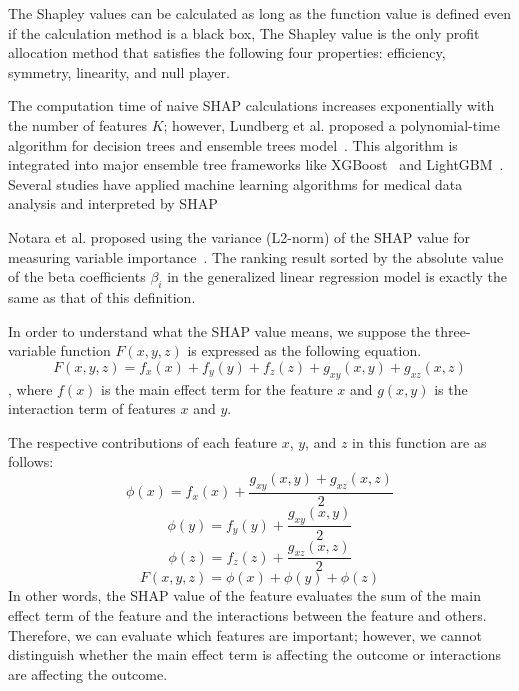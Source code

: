 \documentclass[nohyperref]{article}
\theoremstyle{plain}
\theoremstyle{definition}
\theoremstyle{remark}
\begin{document}
The Shapley values can be calculated as long as the function value is defined even if the calculation method is a black box, 
The Shapley value is the only profit allocation method that satisfies the following four properties: efficiency, symmetry, linearity, and null player.

The computation time of naive SHAP calculations increases exponentially with the number of features $K$; however, Lundberg et al. proposed a polynomial-time algorithm for decision trees and ensemble trees model~\cite{lundberg2020local}.
This algorithm is integrated into major ensemble tree frameworks like XGBoost~\cite{chen2016xgboost} and LightGBM~\cite{ke2017lightgbm}.
Several studies have applied machine learning algorithms for medical data analysis and interpreted by SHAP~\cite{lundberg2020local,moncada2021explainable,inoguchi2021association}

Notara et al. proposed using the variance (L2-norm) of the SHAP value for measuring variable importance~\cite{nohara2022shap}.
The ranking result sorted by the absolute value of the beta coefficients $\beta_i$ in the generalized linear regression model is exactly the same as that of this definition.

In order to understand what the SHAP value means, we suppose the three-variable function $F(x,y,z)$ is expressed as the following equation.
\begin{equation}
F(x,y,z)=f_x(x)+f_y(y)+f_z(z)+g_{xy}(x,y)+g_{xz}(x,z)
\label{3value}
\end{equation}
, where $f(x)$ is the main effect term for the feature $x$ and $g(x,y)$ is the interaction term of features $x$ and $y$.

The respective contributions of each feature $x$, $y$, and $z$ in this function are as follows:
$$\phi(x)=f_x(x)+\frac{g_{xy}(x,y)+g_{xz}(x,z)}{2}$$
$$\phi(y)=f_y(y)+\frac{g_{xy}(x,y)}{2}$$
$$\phi(z)=f_z(z)+\frac{g_{xz}(x,z)}{2}$$
$$F(x,y,z)=\phi(x)+\phi(y)+\phi(z)$$
In other words, the SHAP value of the feature evaluates the sum of the main effect term of the feature and the interactions between the feature and others.
Therefore, we can evaluate which features are important; however, we cannot distinguish whether the main effect term is affecting the outcome or interactions are affecting the outcome.
\end{document}
